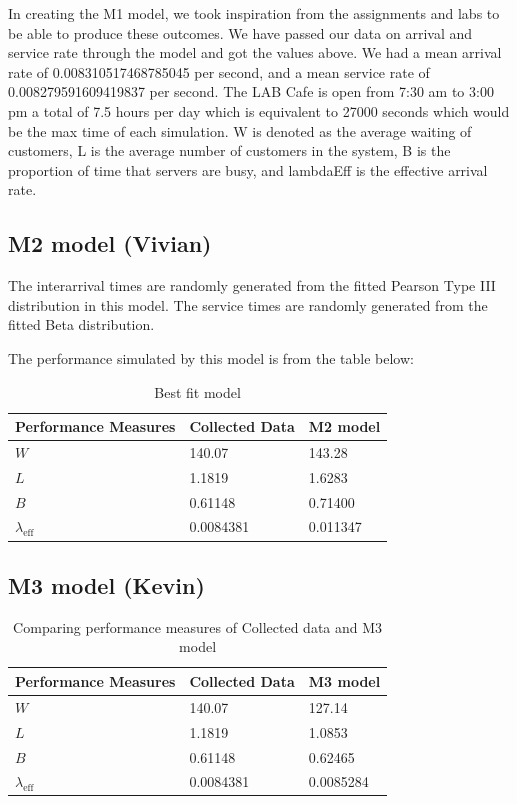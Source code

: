 \documentclass{article}
\begin{document}
In creating the M1 model, we took inspiration from the assignments and labs to be able to produce these outcomes. We have passed our data on arrival and service rate through the model and got the values above.
We had a mean arrival rate of 0.008310517468785045 per second, and a mean service rate of 0.008279591609419837 per second. The LAB Cafe is open from 7:30 am to 3:00 pm a total of 7.5 hours per day which is equivalent to 27000 seconds which would be the max time of each simulation. 
W is denoted as the average waiting of customers, L is the average number of customers in the system, B is the proportion of time that servers are busy, and lambdaEff is the effective arrival rate.

\subsection{M2 model (Vivian)}

The interarrival times are randomly generated from the fitted Pearson Type III distribution in this model. The service times are randomly generated from the fitted Beta distribution.

The performance simulated by this model is from the table below:

\begin{table}[H]
    \centering
    \caption{Best fit model}
    \begin{tabu}{*{3}{X[c]}}
        \toprule
        \textbf{Performance Measures} & \textbf{Collected Data} & \textbf{M2 model}\\
        \midrule
        $W$ & 140.07 & 143.28\\
        $L$ & 1.1819 & 1.6283\\
        $B$ & 0.61148 & 0.71400\\
        $\lambda_{\text{eff}}$ & 0.0084381 & 0.011347\\
        \bottomrule
    \end{tabu}
    \label{tab:M2}
\end{table}



\subsection{M3 model (Kevin)}

\begin{table}[h!]
    \centering
    \caption{Comparing performance measures of Collected data and M3 model}
    \begin{tabu}{*{3}{X[c]}}
        \toprule
        \textbf{Performance Measures} & \textbf{Collected Data} & \textbf{M3 model}\\
        \midrule
        $W$ & 140.07 & 127.14\\
        $L$ & 1.1819 & 1.0853\\
        $B$ & 0.61148 & 0.62465\\
        $\lambda_{\text{eff}}$ & 0.0084381 & 0.0085284\\
        \bottomrule
    \end{tabu}
    \label{tab:M3}
\end{table}
\end{document}
